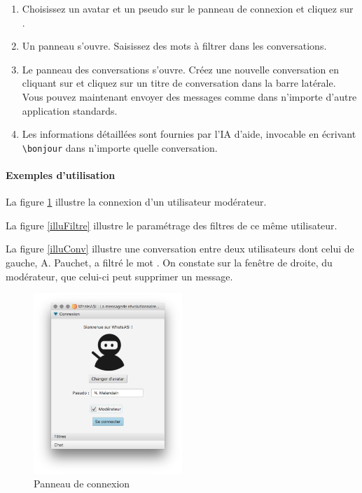 \documentclass[11pt,dvipsnames,svgnames]{report}
\begin{document}
\begin{enumerate}
\item Choisissez un avatar et un pseudo sur le panneau de connexion et cliquez sur .
\item Un panneau s'ouvre. Saisissez des mots à filtrer dans les conversations.
\item Le panneau des conversations s'ouvre. Créez une nouvelle conversation en cliquant sur \menu{+} et cliquez sur un titre de conversation dans la barre latérale. Vous pouvez maintenant envoyer des messages comme dans n'importe d'autre application standards.
\item Les informations détaillées sont fournies par l'IA d'aide, invocable en écrivant \texttt{\textbackslash bonjour} dans n'importe quelle conversation.
\end{enumerate}

\paragraph*{Exemples d'utilisation}
La figure \ref{illuConn} illustre la connexion d'un utilisateur modérateur.

La figure \ref{illuFiltre} illustre le paramétrage des filtres de ce même utilisateur.

La figure \ref{illuConv} illustre une conversation entre deux utilisateurs dont celui de gauche, A. Pauchet, a filtré le mot  \fg{}. On constate sur la fenêtre de droite, du modérateur, que celui-ci peut supprimer un message.

\begin{figure}[H]
\caption{Panneau de connexion}
\label{illuConn}
\centerline{\includegraphics[width=0.5\textwidth]{images/illuConnexion.png}}
\end{figure}
\end{document}
